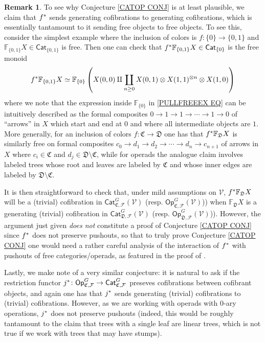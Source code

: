 \documentclass[a4paper,10pt
,draft
]{article}%
\numberwithin{equation}{section}
\numberwithin{figure}{section}
\theoremstyle{definition} %
\newtheorem{remark}[equation]{Remark}%
\newcommand{\F}{\ensuremath{\mathcal F}}
\newcommand{\V}{\ensuremath{\mathcal V}}
\newcommand{\1}{\ensuremath{\mathbbm 1}}%
\begin{document}
\begin{remark}
To see why Conjecture \ref{CATOP CONJ} is at least plausible,
we claim that $f^{\**}$ sends generating cofibrations to generating cofibrations, 
which is essentially tantamount to it sending free objects to free objects.
To see this, consider the simplest example 
where the inclusion of colors is 
$f \colon \{0\} \to \{0,1\}$
and $\mathbb{F}_{\{0,1\}}X \in \mathsf{Cat}_{\{0,1\}}$ is free.
Then one can check that $f^{\**} \mathbb{F}_{\{0,1\}}X \in \mathsf{Cat}_{\{0\}}$ is the free monoid
\begin{equation}\label{PULLFREEEX EQ}
	f^{\**} \mathbb{F}_{\{0,1\}}X
\simeq
	\mathbb{F}_{\{0\}}
	\left(X(0,0) \amalg 
	\coprod_{n \geq 0}
	X(0,1)\otimes X(1,1)^{\otimes n} \otimes X(1,0) 
	\right)
\end{equation}
where we note that the expression inside
$\mathbb{F}_{\{0\}}$
in \eqref{PULLFREEEX EQ}
can be intuitively described as the formal composites
$0 \to 1 \to 1 \to \cdots \to 1 \to 0$
of ``arrows'' in $X$ which start and end at $0$ and where all intermediate objects are $1$.
More generally, for an inclusion of colors 
$f \colon \mathfrak{C} \to \mathfrak{D}$
one has that $f^{\**} \mathbb{F}_{\mathfrak{D}} X$
is similarly free on formal composites
$c_0 \to d_1 \to d_2 \to \cdots \to d_n \to c_{n+1}$
of arrows in $X$
where $c_i \in \mathfrak{C}$
and $d_j \in \mathfrak{D} \setminus \mathfrak{C}$,
while for operads the analogue claim involves labeled trees whose root and leaves are labeled by $\mathfrak{C}$
and whose inner edges are labeled by 
$\mathfrak{D} \setminus \mathfrak{C}$.
 
It is then straightforward to check that, under mild assumptions on $\V$,
$f^{\**} \mathbb{F}_{\mathfrak{D}} X$
will be a (trivial) cofibration in 
$\mathsf{Cat}^G_{\mathfrak{C},\F}(\V)$
(resp. $\mathsf{Op}^G_{\mathfrak{C},\F}(\V)$))
when $\mathbb{F}_{\mathfrak{D}} X$
is a generating (trivial) cofibration
in $\mathsf{Cat}^G_{\mathfrak{D},\F}(\V)$
(resp. $\mathsf{Op}^G_{\mathfrak{D},\F}(\V)$)).
However, the argument just given \emph{does not} constitute a proof of Conjecture \ref{CATOP CONJ}
since $f^{\**}$ does not preserve pushouts, 
so that to truly prove Conjecture \ref{CATOP CONJ}
one would need a rather careful analysis of the interaction of $f^{\**}$ with pushouts of free categories/operads, 
as featured in the proof of \cite[Thm. 1.15]{BM13}.

Lastly, we make note of a very similar conjecture:
it is natural to ask if the restriction functor
$j^{\**} \colon \mathsf{Op}_{\mathfrak{C},\F}^G 
\to \mathsf{Cat}_{\mathfrak{C},\F}^G$
preseves cofibrations between cofibrant objects,
and again one has that $j^{\**}$ 
sends generating (trivial) cofibrations to (trivial) cofibrations.
However, as we are working with operads with $0$-ary operations, %
$j^{\**}$ does not preserve pushouts
(indeed, this would be roughly tantamount to the claim that trees with a single leaf are linear trees, which is not true if we work with trees that may have stumps).
\end{remark}
\end{document}
